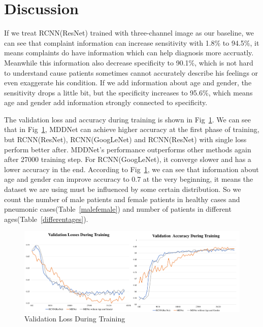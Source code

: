 
\section{Discussion}
\label{discuss}
If we treat RCNN(ResNet) trained with three-channel image as our baseline, we can see that complaint information can increase sensitivity with 1.8\% to 94.5\%, it means complaints do have information which can help diagnosis more accruatly. Meanwhile this information also decrease specificity to 90.1\%, which is not hard to understand cause patients sometimes cannot accurately describe his feelings or even exaggerate his condition. If we add information about age and gender, the sensitivity drops a little bit, but the specificity increases to 95.6\%, which means age and gender add information strongly connected to specificity.

The validation loss and accuracy during training is shown in Fig~\ref{loss}. We can see that in Fig~\ref{loss}, MDDNet can achieve higher accuracy at the first phase of training, but RCNN(ResNet), RCNN(GoogLeNet) and RCNN(ResNet) with single loss perform better after. MDDNet's performance outperforms other methods again after 27000 training step. For RCNN(GoogLeNet), it converge slower and has a lower accuracy in the end. According to Fig~\ref{loss}, we can see that information about age and gender can improve accuracy to 0.7 at the very beginning, it means the dataset we are using must be influenced by some certain distribution. So we count the number of male patients and female patients in healthy cases and pneumonic cases(Table~\ref{malefemale}) and number of patients in different ages(Table~\ref{differentages}). 


\begin{figure}[t]
    \centerline{\includegraphics[width=200mm]{losses.pdf}}
    \vspace{-0cm}
    \caption{Validation Loss During Training}
    \vspace{-0cm}
    \label{loss}
    \end{figure}


